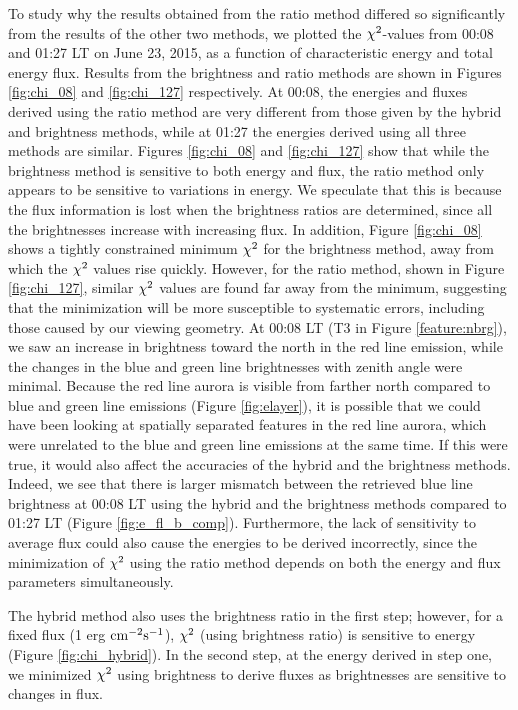 To study why the results obtained from the ratio method differed so significantly from the results of the other two methods, we plotted the $\rm \chi^2$-values from 00:08 and 01:27 LT on June 23, 2015, as a function of characteristic energy and total energy flux. Results from the brightness and ratio methods are shown in Figures \ref{fig:chi_08} and \ref{fig:chi_127} respectively. At 00:08, the energies and fluxes derived using the ratio method are very different from those given by the hybrid and brightness methods, while at 01:27 the energies derived using all three methods are similar. Figures \ref{fig:chi_08} and \ref{fig:chi_127} show that while the brightness method is sensitive to both energy and flux, the ratio method only appears to be sensitive to variations in energy. We speculate that this is because the flux information is lost when the brightness ratios are determined, since all the brightnesses increase with increasing flux. In addition, Figure \ref{fig:chi_08} shows a tightly constrained minimum $\rm \chi^2$ for the brightness method, away from which the $\rm \chi^2$ values rise quickly. However, for the ratio method, shown in Figure \ref{fig:chi_127}, similar $\rm \chi^2$ values are found far away from the minimum, suggesting that the minimization will be more susceptible to systematic errors, including those caused by our viewing geometry. At 00:08 LT (T3 in Figure \ref{feature:nbrg}), we saw an increase in brightness toward the north in the red line emission, while the changes in the blue and green line brightnesses with zenith angle were minimal. Because the red line aurora is visible from farther north compared to blue and green line emissions (Figure \ref{fig:elayer}), it is possible that we could have been looking at spatially separated features in the red line aurora, which were unrelated to the blue and green line emissions at the same time. If this were true, it would also affect the accuracies of the hybrid and the brightness methods. Indeed, we see that there is larger mismatch between the retrieved blue line brightness at 00:08 LT using the hybrid and the brightness methods compared to 01:27 LT (Figure \ref{fig:e_fl_b_comp}). Furthermore, the lack of sensitivity to average flux could also cause the energies to be derived incorrectly, since the minimization of $\rm \chi^2$ using the ratio method depends on both the energy and flux parameters simultaneously.

The hybrid method also uses the brightness ratio in the first step; however, for a fixed flux (1 erg $\rm cm^{-2}s^{-1}$), $\rm \chi^2$ (using brightness ratio) is sensitive to energy (Figure \ref{fig:chi_hybrid}). In the second step, at the energy derived in step one, we minimized $\rm \chi^2$ using brightness to derive fluxes as brightnesses are sensitive to changes in flux.

